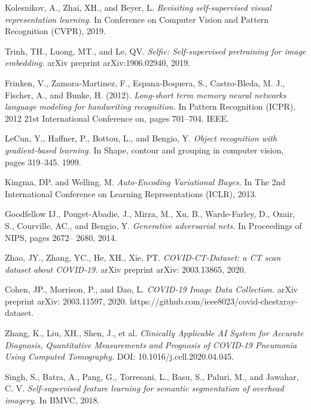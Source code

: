 \begin{thebibliography}{1}
	

	

	 Kolesnikov, A., Zhai, XH., and Beyer, L. \textit{Revisiting self-supervised visual representation learning.} In Conference on Computer Vision and Pattern Recognition (CVPR), 2019.

	 Trinh, TH., Luong, MT., and Le, QV. \textit{Selfie: Self-supervised pretraining for image	embedding.} arXiv preprint arXiv:1906.02940, 2019.

	 Frinken, V., Zamora-Martinez, F., Espana-Boquera, S., Castro-Bleda, M. J., Fischer, A., and Bunke, H. (2012). \textit{Long-short term memory neural networks language modeling for handwriting recognition.} In Pattern Recognition (ICPR), 2012 21st International Conference on, pages 701–704. IEEE.

	  LeCun, Y., Haffner, P., Bottou, L., and Bengio, Y. \textit{Object recognition with gradient-based learning.} In Shape, contour and grouping in computer vision, pages 319–345. 1999.

	 Kingma, DP. and Welling, M. \textit{Auto-Encoding Variational Bayes.} In The 2nd International Conference on Learning Representations (ICLR), 2013.

	  Goodfellow IJ., Pouget-Abadie, J., Mirza, M., Xu, B., Warde-Farley, D., Ozair, S., Courville, AC., and Bengio, Y. \textit{Generative adversarial nets.} In Proceedings of NIPS, pages 2672– 2680, 2014.

	 Zhao, JY., Zhang, YC., He, XH., Xie, PT. \textit{COVID-CT-Dataset: a CT scan dataset about COVID-19.} arXiv preprint arXiv: 2003.13865, 2020.

	 Cohen, JP., Morrison, P., and Dao, L.  \textit{COVID-19 Image Data Collection.} arXiv preprint arXiv: 2003.11597, 2020. https://github.com/ieee8023/covid-chestxray-dataset.



	 Zhang, K., Liu, XH., Shen, J., et al. \textit{Clinically Applicable AI System for Accurate Diagnosis, Quantitative Measurements and Prognosis of COVID-19 Pneumonia Using Computed Tomography.} DOI: 10.1016/j.cell.2020.04.045.
	
	  Singh, S., Batra, A., Pang, G., Torresani, L., Basu, S.,  Paluri, M., and Jawahar, C. V.  \textit{Self-supervised feature learning for semantic segmentation of
	overhead imagery.} In BMVC, 2018.

	
	
	
	
	

\end{thebibliography}
